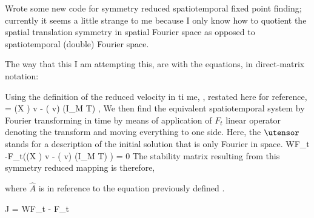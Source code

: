 Wrote some new code for symmetry reduced spatiotemporal fixed point finding; currently
it seems a little strange to me because I only know how to quotient the spatial translation
symmetry in spatial Fourier space as opposed to spatiotemporal (double) Fourier space.

The way that this I am attempting this, are with the equations, in direct-matrix notation:

Using the definition of the reduced velocity in ti
me, , restated here
for reference,
\beq
{} = (X \cdot \utensor) \ast v - ( \cdot v) \ast (I_M \otimes T) \cdot \utensor,
\eeq
We then find the equivalent spatiotemporal system by Fourier transforming in time by means
of application of $F_t$ linear operator denoting the transform and moving everything to one
side. Here, the $\utensor$ stands for a description of the initial solution that is only Fourier in space.
\beq
W\cdot F_t \cdot \utensor -F_t\cdot((X \cdot \utensor) \ast v - ( \cdot v) \ast (I_M \otimes T) \cdot \utensor) = 0
\eeq
The stability matrix resulting from this symmetry reduced mapping is therefore,

where $\hat{A}$ is in reference to the equation previously defined .

\beq
J = W\cdot F_t - F_t\cdot {}
\eeq